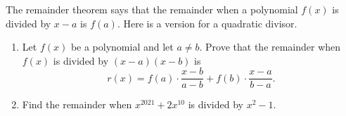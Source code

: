 The remainder theorem says that the remainder when a polynomial $f(x)$ is divided by $x-a$ is $f(a)$. Here is a version for a quadratic divisor.
\begin{enumerate}
\item[(a)] Let $f(x)$ be a polynomial and let $a\ne b$. Prove that the remainder when $f(x)$ is divided by $(x-a)(x-b)$ is
\[r(x)=f(a)\cdot\dfrac{x-b}{a-b}+f(b)\cdot\dfrac{x-a}{b-a}.\]
\item[(b)] Find the remainder when $x^{2021}+2x^{10}$ is divided by $x^2-1$.
\end{enumerate}
